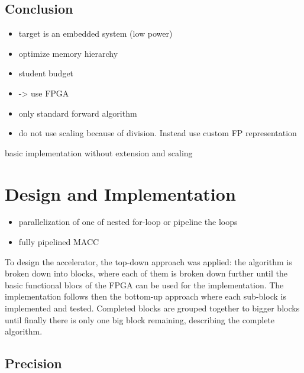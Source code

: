 \documentclass[mscthesis]{usiinfthesis}
\begin{document}
\subsection{Conclusion}
\begin{itemize}
    \item target is an embedded system (low power)
    \item optimize memory hierarchy
    \item student budget
    \item -> use FPGA
    \item only standard forward algorithm
    \item do not use scaling because of division. Instead use custom FP
        representation
\end{itemize}

basic implementation without extension and scaling


\section{Design and Implementation}
\label{ch:acc_des}
\begin{itemize}
    \item parallelization of one of nested for-loop or pipeline the loops
    \item fully pipelined MACC
\end{itemize}

To design the accelerator, the top-down approach was applied: the algorithm is
broken down into blocks, where each of them is broken down further until the
basic functional blocs of the FPGA can be used for the implementation. The
implementation follows then the bottom-up approach where each sub-block is
implemented and tested. Completed blocks are grouped together to bigger blocks
until finally there is only one big block remaining, describing the complete
algorithm.

\subsection{Precision}
\end{document}
